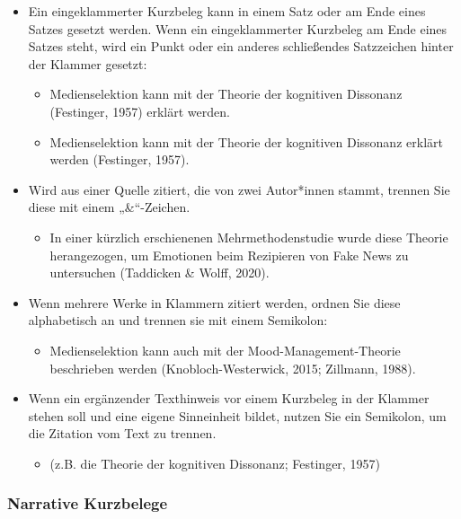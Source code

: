 \documentclass[
  letterpaper,
  DIV=11]{scrreprt}
\providecommand{\tightlist}{%
  \setlength{\itemsep}{0pt}\setlength{\parskip}{0pt}}\usepackage{longtable,booktabs,array}
\begin{document}
\begin{itemize}
\item
  Ein eingeklammerter Kurzbeleg kann in einem Satz oder am Ende eines
  Satzes gesetzt werden. Wenn ein eingeklammerter Kurzbeleg am Ende
  eines Satzes steht, wird ein Punkt oder ein anderes schließendes
  Satzzeichen hinter der Klammer gesetzt:

  \begin{itemize}
  \item
    Medienselektion kann mit der Theorie der kognitiven Dissonanz
    (Festinger, 1957) erklärt werden.
  \item
    Medienselektion kann mit der Theorie der kognitiven Dissonanz
    erklärt werden (Festinger, 1957).
  \end{itemize}
\item
  Wird aus einer Quelle zitiert, die von zwei Autor*innen stammt,
  trennen Sie diese mit einem „\&``-Zeichen.

  \begin{itemize}
  \tightlist
  \item
    In einer kürzlich erschienenen Mehrmethodenstudie wurde diese
    Theorie herangezogen, um Emotionen beim Rezipieren von Fake News zu
    untersuchen (Taddicken \& Wolff, 2020).
  \end{itemize}
\item
  Wenn mehrere Werke in Klammern zitiert werden, ordnen Sie diese
  alphabetisch an und trennen sie mit einem Semikolon:

  \begin{itemize}
  \tightlist
  \item
    Medienselektion kann auch mit der Mood-Management-Theorie
    beschrieben werden (Knobloch-Westerwick, 2015; Zillmann, 1988).
  \end{itemize}
\item
  Wenn ein ergänzender Texthinweis vor einem Kurzbeleg in der Klammer
  stehen soll und eine eigene Sinneinheit bildet, nutzen Sie ein
  Semikolon, um die Zitation vom Text zu trennen.

  \begin{itemize}
  \tightlist
  \item
    (z.B. die Theorie der kognitiven Dissonanz; Festinger, 1957)
  \end{itemize}
\end{itemize}

\hypertarget{narrative-kurzbelege}{%
\subsubsection{Narrative Kurzbelege}\label{narrative-kurzbelege}}
\end{document}

